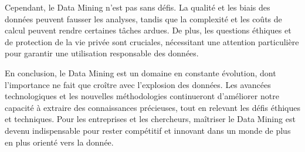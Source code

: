 \documentclass[a4paper,12pt]{article}
\begin{document}
Cependant, le Data Mining n'est pas sans défis. La qualité et les biais des données peuvent fausser les analyses, tandis que la complexité et les coûts de calcul peuvent rendre certaines tâches ardues. De plus, les questions éthiques et de protection de la vie privée sont cruciales, nécessitant une attention particulière pour garantir une utilisation responsable des données.

En conclusion, le Data Mining est un domaine en constante évolution, dont l'importance ne fait que croître avec l'explosion des données. Les avancées technologiques et les nouvelles méthodologies continueront d'améliorer notre capacité à extraire des connaissances précieuses, tout en relevant les défis éthiques et techniques. Pour les entreprises et les chercheurs, maîtriser le Data Mining est devenu indispensable pour rester compétitif et innovant dans un monde de plus en plus orienté vers la donnée.
\nocite{*} 
 \newpage
 

 
\end{document}
